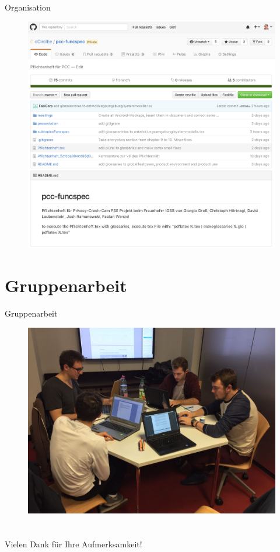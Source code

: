 \documentclass[18pt]{beamer}
\begin{document}
\begin{frame}[allowframebreaks]{Organisation}
\begin{figure}
\begin{center}
			\includegraphics[scale=0.22]{logos/Github} 
		\end{center}
	\end{figure}				
\end{frame}

\section{Gruppenarbeit}
\begin{frame}{Gruppenarbeit}
	\begin{figure}
		\begin{center}
			\includegraphics[scale=0.16]{logos/Gruppenarbeit} 
		\end{center}
	\end{figure}		
\end{frame}

\section{}
\begin{frame}
	\begin{center}
 		Vielen Dank f\"ur Ihre Aufmerksamkeit!
	\end	{center} 	
\end{frame}
\end{document}
